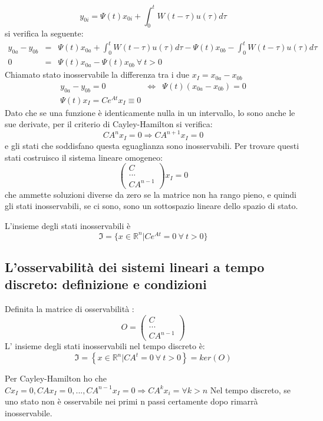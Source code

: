 \documentclass{article}
\begin{document}
\[ y_{0i} = \Psi(t)x_{0i} + \int_{0}^{t} W(t-\tau) u(\tau) d\tau \]
si verifica la seguente:
\[
    \begin{array}{rcl}
        y_{0a}-y_{0b} & = & \Psi(t)x_{0a} + \int_{0}^{t} W(t-\tau) u(\tau) d\tau - \Psi(t)x_{0b} - \int_{0}^{t} W(t-\tau) u(\tau) d\tau \\
        0 & = & \Psi(t)x_{0a} - \Psi(t)x_{0b} \  \forall\   t>0
    \end{array}    
\]
Chiamato stato inosservabile la differenza tra i due $x_I = x_{0a}-x_{0b}$
\[
    \begin{array}{rcl}
        y_{0a}-y_{0b}  = 0 & \Longleftrightarrow & \Psi(t)(x_{0a} -x_{0b} ) = 0  \\
        \Psi(t)x_I = C e^{At}x_I \equiv 0
    \end{array}    
\]
Dato che se una funzione è identicamente nulla in un intervallo, lo sono anche
le sue derivate, per il criterio di Cayley-Hamilton si verifica:
\[ C A^n x_I = 0 \Longrightarrow C A^{n+1} x_I = 0 \]
e gli stati che soddisfano questa eguaglianza sono inosservabili.
Per trovare questi stati costruisco il sistema lineare omogeneo:
\[\begin{pmatrix}C\\...\\CA^{n-1}\end{pmatrix}x_I = 0\]
che ammette soluzioni diverse da zero se la matrice non ha rango pieno, e quindi gli stati inosservabili,
se ci sono, sono un sottospazio lineare dello spazio di stato.

L'insieme degli stati inosservabili è 
\[\mathfrak{I} = \{ x\in\mathbb{R}^n | Ce^{At}=0\ \forall\ t > 0\}\]



\subsection{L'osservabilità dei sistemi lineari a tempo discreto: definizione e condizioni}
Definita la matrice di osservabilità :
\[O = \begin{pmatrix}C\\...\\CA^{n-1}\end{pmatrix}\]
L' insieme degli stati inosservabili nel tempo discreto è:
\[\mathfrak{I} = \left\{ x\in\mathbb{R}^n | CA^t=0\ \forall\ t > 0\right\} = ker(O)\]

Per Cayley-Hamilton ho che $Cx_I=0,CAx_I=0,...,CA^{n-1}x_I=0 \Longrightarrow CA^kx_i = \forall k>n$
Nel tempo discreto, se uno stato non è osservabile nei primi n passi certamente dopo rimarrà inosservabile.
\end{document}

